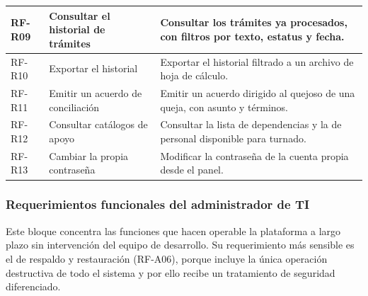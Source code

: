 \begin{longtable}{|p{1.5cm}|p{3.6cm}|p{9.0cm}|}
		RF-R09 & Consultar el historial de trámites & Consultar los trámites ya procesados, con
		filtros por texto, estatus y fecha. \\ \hline
	
		RF-R10 & Exportar el historial & Exportar el historial filtrado a un archivo de hoja de
		cálculo. \\ \hline
	
		RF-R11 & Emitir un acuerdo de conciliación & Emitir un acuerdo dirigido al quejoso de una
		queja, con asunto y términos. \\ \hline
	
		RF-R12 & Consultar catálogos de apoyo & Consultar la lista de dependencias y la de personal
		disponible para turnado. \\ \hline
	
		RF-R13 & Cambiar la propia contraseña & Modificar la contraseña de la cuenta propia desde el
		panel. \\ \hline
	\end{longtable}
	
	\normalsize
	
	\subsubsection{Requerimientos funcionales del administrador de TI}
	Este bloque concentra las funciones que hacen operable la plataforma a largo plazo sin
	intervención del equipo de desarrollo. Su requerimiento más sensible es el de respaldo y
	restauración (RF-A06), porque incluye la única operación destructiva de todo el sistema y por
	ello recibe un tratamiento de seguridad diferenciado.
	
	\small
	\renewcommand{\arraystretch}{1.2}
	
